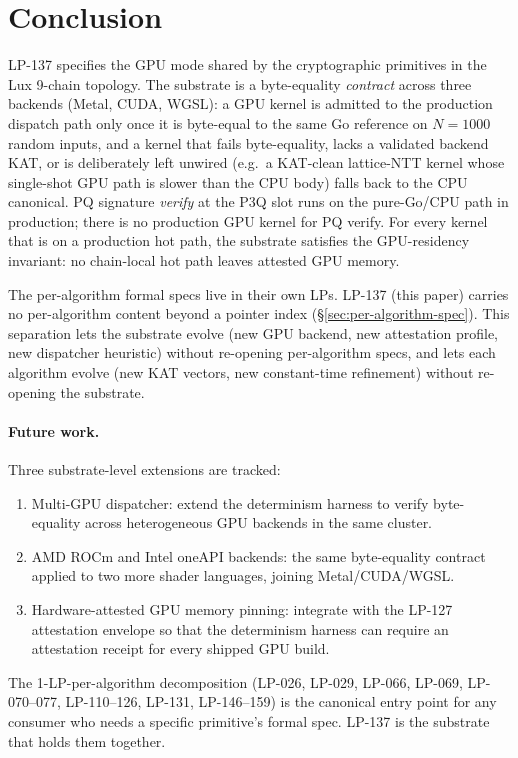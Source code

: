\section{Conclusion}
\label{sec:conclusion}

LP-137 specifies the GPU mode shared by the cryptographic primitives in the Lux 9-chain topology. The substrate is a byte-equality \emph{contract} across three backends (Metal, CUDA, WGSL): a GPU kernel is admitted to the production dispatch path only once it is byte-equal to the same Go reference on $N=1000$ random inputs, and a kernel that fails byte-equality, lacks a validated backend KAT, or is deliberately left unwired (e.g.\ a KAT-clean lattice-NTT kernel whose single-shot GPU path is slower than the CPU body) falls back to the CPU canonical. PQ signature \emph{verify} at the P3Q slot runs on the pure-Go/CPU path in production; there is no production GPU kernel for PQ verify. For every kernel that is on a production hot path, the substrate satisfies the GPU-residency invariant: no chain-local hot path leaves attested GPU memory.

The per-algorithm formal specs live in their own LPs. LP-137 (this paper) carries no per-algorithm content beyond a pointer index (\S\ref{sec:per-algorithm-spec}). This separation lets the substrate evolve (new GPU backend, new attestation profile, new dispatcher heuristic) without re-opening per-algorithm specs, and lets each algorithm evolve (new KAT vectors, new constant-time refinement) without re-opening the substrate.

\paragraph{Future work.} Three substrate-level extensions are tracked:

\begin{enumerate}
\item Multi-GPU dispatcher: extend the determinism harness to verify byte-equality across heterogeneous GPU backends in the same cluster.
\item AMD ROCm and Intel oneAPI backends: the same byte-equality contract applied to two more shader languages, joining Metal/CUDA/WGSL.
\item Hardware-attested GPU memory pinning: integrate with the LP-127 attestation envelope so that the determinism harness can require an attestation receipt for every shipped GPU build.
\end{enumerate}

The 1-LP-per-algorithm decomposition (LP-026, LP-029, LP-066, LP-069, LP-070--077, LP-110--126, LP-131, LP-146--159) is the canonical entry point for any consumer who needs a specific primitive's formal spec. LP-137 is the substrate that holds them together.
